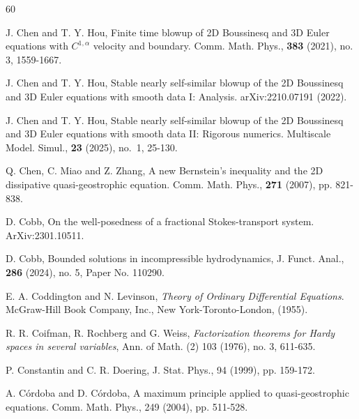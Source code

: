 \documentclass[reqno,11pt,a4paper]{amsart}
\begin{document}
\begin{thebibliography}{60}

 J. Chen and T. Y. Hou,
Finite time blowup of 2D Boussinesq and 3D Euler equations with $C^{1,\alpha}$ velocity and boundary.
Comm. Math. Phys., \textbf{383} (2021), no. 3, 1559-1667.

J. Chen and T. Y. Hou,
Stable nearly self-similar blowup of the 2D Boussinesq
and 3D Euler equations with smooth data I: Analysis.
arXiv:2210.07191 (2022).

J. Chen and T. Y. Hou,
Stable nearly self-similar blowup of the 2D Boussinesq
and 3D Euler equations with smooth data II: Rigorous numerics.
Multiscale Model. Simul.,
\textbf{23} (2025), no.~1, 25-130.







Q. Chen, C. Miao and Z. Zhang,
A new Bernstein’s inequality and the 2D dissipative quasi-geostrophic equation.
Comm. Math. Phys., \textbf{271} (2007), pp. 821-838.

D. Cobb,  On the well-posedness of a fractional Stokes-transport system.
ArXiv:2301.10511.

D. Cobb,
Bounded solutions in incompressible hydrodynamics,
J. Funct. Anal.,
\textbf{286} (2024), no. 5, Paper No. 110290.

E. A. Coddington and N. Levinson,
\textit{Theory of Ordinary Differential Equations}.
McGraw-Hill Book Company, Inc., New York-Toronto-London, (1955).

R. R. Coifman, R. Rochberg and G. Weiss,
\emph{Factorization theorems for Hardy spaces in several variables},
Ann. of Math. (2) 103 (1976), no. 3, 611-635.


P. Constantin and C. R. Doering,  J. Stat. Phys., 94
(1999), pp. 159-172.

A. C\'ordoba and D. C\'ordoba,
A maximum principle applied to quasi-geostrophic equations.
Comm. Math. Phys., 249 (2004), pp. 511-528.




\end{thebibliography}
\end{document}
